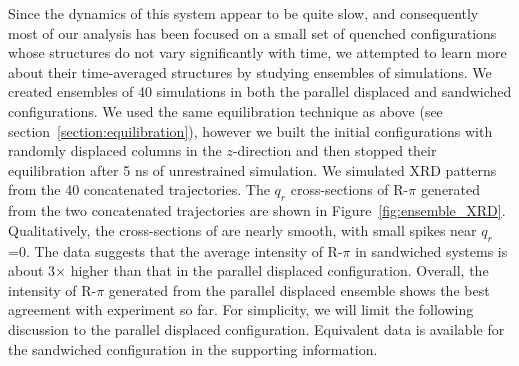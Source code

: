 \documentclass[journal=jpcbfk,manuscript=article]{achemso}
\begin{document}
  Since the dynamics of this system appear to be quite slow, and consequently most of
  our analysis has been focused on a small set of quenched configurations whose 
  structures do not vary significantly with time, we attempted
  to learn more about their time-averaged structures by studying ensembles of simulations.
  We created ensembles of 40 simulations in both the parallel displaced and 
  sandwiched configurations. We used the same equilibration technique as above 
  (see section~\ref{section:equilibration}), however we built the initial
  configurations with randomly displaced columns in the $z$-direction and
  then stopped their equilibration after 5 ns of unrestrained simulation. We 
  simulated XRD patterns from the 40 concatenated trajectories. The $q_r$ 
  cross-sections of R-$\pi$ generated from the two concatenated trajectories are shown
  in Figure~\ref{fig:ensemble_XRD}. Qualitatively, the cross-sections
  of are nearly smooth, with small spikes near $q_r$=0. The data 
  suggests that the average intensity of R-$\pi$ in sandwiched systems is 
  about 3$\times$ higher than that in the parallel displaced configuration. 
  Overall, the intensity of R-$\pi$ generated from the parallel displaced 
  ensemble shows the best agreement with experiment so far. For simplicity, 
  we will limit the following discussion to the parallel displaced configuration.
  Equivalent data is available for the sandwiched configuration in the
  supporting information. %
  
\end{document}
